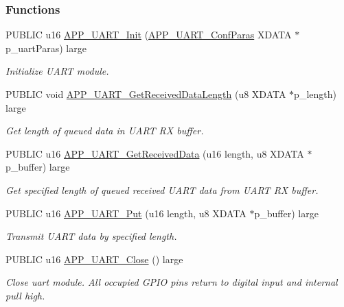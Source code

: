 \subsubsection*{Functions}
\begin{DoxyCompactItemize}
\item 
P\+U\+B\+L\+IC u16 \hyperlink{group___u_a_r_t_gab8258af04badd0816cd07778a0104d56}{A\+P\+P\+\_\+\+U\+A\+R\+T\+\_\+\+Init} (\hyperlink{struct_a_p_p___u_a_r_t___conf_paras}{A\+P\+P\+\_\+\+U\+A\+R\+T\+\_\+\+Conf\+Paras} X\+D\+A\+TA $\ast$p\+\_\+uart\+Paras) large
\begin{DoxyCompactList}\small\item\em Initialize U\+A\+RT module. \end{DoxyCompactList}\item 
P\+U\+B\+L\+IC void \hyperlink{group___u_a_r_t_ga408769ebc1640f2cd7912a62e6152131}{A\+P\+P\+\_\+\+U\+A\+R\+T\+\_\+\+Get\+Received\+Data\+Length} (u8 X\+D\+A\+TA $\ast$p\+\_\+length) large
\begin{DoxyCompactList}\small\item\em Get length of queued data in U\+A\+RT RX buffer. \end{DoxyCompactList}\item 
P\+U\+B\+L\+IC u16 \hyperlink{group___u_a_r_t_ga87d172513bcd8017fe1a2c0e24e56215}{A\+P\+P\+\_\+\+U\+A\+R\+T\+\_\+\+Get\+Received\+Data} (u16 length, u8 X\+D\+A\+TA $\ast$p\+\_\+buffer) large
\begin{DoxyCompactList}\small\item\em Get specified length of queued received U\+A\+RT data from U\+A\+RT RX buffer. \end{DoxyCompactList}\item 
P\+U\+B\+L\+IC u16 \hyperlink{group___u_a_r_t_ga9ab68c53bc30c9f6313a01d73b0baf52}{A\+P\+P\+\_\+\+U\+A\+R\+T\+\_\+\+Put} (u16 length, u8 X\+D\+A\+TA $\ast$p\+\_\+buffer) large
\begin{DoxyCompactList}\small\item\em Transmit U\+A\+RT data by specified length. \end{DoxyCompactList}\item 
P\+U\+B\+L\+IC u16 \hyperlink{group___u_a_r_t_ga9a7e6343707bf21c6c838830cd7a61a8}{A\+P\+P\+\_\+\+U\+A\+R\+T\+\_\+\+Close} () large
\begin{DoxyCompactList}\small\item\em Close uart module. All occupied G\+P\+IO pins return to digital input and internal pull high. \end{DoxyCompactList}\end{DoxyCompactItemize}


